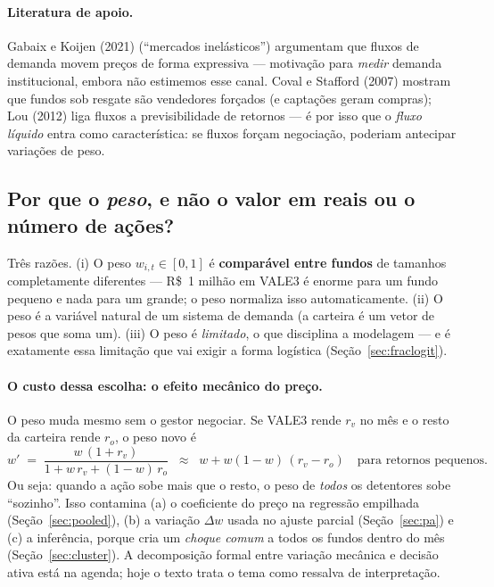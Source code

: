 \documentclass[11pt,a4paper]{article}
\begin{document}
\paragraph{Literatura de apoio.} Gabaix e Koijen (2021) (``mercados inelásticos'') argumentam que
fluxos de demanda movem preços de forma expressiva --- motivação para \emph{medir} demanda
institucional, embora não estimemos esse canal. Coval e Stafford (2007) mostram que fundos sob
resgate são vendedores forçados (e captações geram compras); Lou (2012) liga fluxos a
previsibilidade de retornos --- é por isso que o \emph{fluxo líquido} entra como característica: se
fluxos forçam negociação, poderiam antecipar variações de peso.

\subsection{Por que o \emph{peso}, e não o valor em reais ou o número de ações?}

Três razões. (i) O peso $w_{i,t}\in[0,1]$ é \textbf{comparável entre fundos} de tamanhos
completamente diferentes --- R\$~1 milhão em VALE3 é enorme para um fundo pequeno e nada para um
grande; o peso normaliza isso automaticamente. (ii) O peso é a variável natural de um sistema de
demanda (a carteira é um vetor de pesos que soma um). (iii) O peso é \emph{limitado}, o que
disciplina a modelagem --- e é exatamente essa limitação que vai exigir a forma logística
(Seção~\ref{sec:fraclogit}).

\paragraph{O custo dessa escolha: o efeito mecânico do preço.} O peso muda mesmo sem o gestor
negociar. Se VALE3 rende $r_v$ no mês e o resto da carteira rende $r_o$, o peso novo é
\begin{equation}
w' \;=\; \frac{w\,(1+r_v)}{1 + w\,r_v + (1-w)\,r_o}
\;\;\approx\;\; w + w(1-w)\,(r_v - r_o)
\quad\text{para retornos pequenos.}
\label{eq:mecanico}
\end{equation}
Ou seja: quando a ação sobe mais que o resto, o peso de \emph{todos} os detentores sobe
``sozinho''. Isso contamina (a) o coeficiente do preço na regressão empilhada
(Seção~\ref{sec:pooled}), (b) a variação $\Delta w$ usada no ajuste parcial
(Seção~\ref{sec:pa}) e (c) a inferência, porque cria um \emph{choque comum} a todos os fundos
dentro do mês (Seção~\ref{sec:cluster}). A decomposição formal entre variação mecânica e decisão
ativa está na agenda; hoje o texto trata o tema como ressalva de interpretação.
\end{document}
